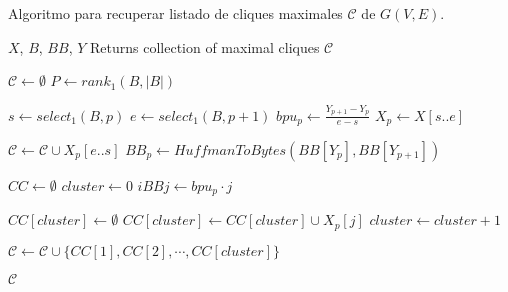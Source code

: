 \begin{algorithm}[H]
\caption{Algoritmo para recuperar listado de cliques maximales $\mathcal{C}$ de $G(V, E)$.}
\label{alg:cliques}
\begin{algorithmic}[1]
    \REQUIRE $X$, $B$, $BB$, $Y$
    \ENSURE Returns collection of maximal cliques $\mathcal{C}$

    \STATE $\mathcal{C} \leftarrow \emptyset$
    \STATE $P \leftarrow rank_{1}(B, |B|)$

        \STATE $s \leftarrow select_{1}(B, p)$
        \STATE $e \leftarrow select_{1}(B, p + 1)$
        \STATE $bpu_{p} \leftarrow \frac{Y_{p + 1} - Y_{p}}{e - s}$
        \STATE $X_{p} \leftarrow X[s..e]$
        
            \STATE $\mathcal{C} \leftarrow \mathcal{C} \cup {X_{p}[e..s]}$
       	\ELSE
       		\STATE $BB_{p} \leftarrow HuffmanToBytes(BB[Y_{p}], BB[Y_{p + 1}])$

		\STATE $CC \leftarrow \emptyset$
            	\STATE $cluster \leftarrow 0$
            	\STATE $iBBj \leftarrow bpu_{p} \cdot j$
            	

                		\STATE $CC[cluster] \leftarrow \emptyset$
                        	\STATE $CC[cluster] \leftarrow CC[cluster] \cup X_{p}[j]$
                    	\ENDIF
                    	\STATE $cluster \leftarrow cluster + 1$
                	\ENDFOR
                	
            	\ENDFOR
        	\ENDFOR
        \ENDIF
        
        \STATE $\mathcal{C} \leftarrow \mathcal{C} \cup \{CC[1], CC[2], \cdots, CC[cluster]\}$
    \ENDFOR

    \RETURN $\mathcal{C}$
\end{algorithmic}
\end{algorithm}
